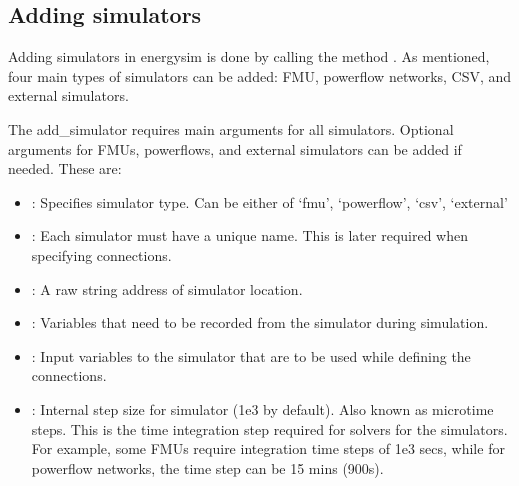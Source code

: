 \documentclass[letterpaper,10pt,english]{sphinxmanual}
\begin{document}
\begin{sphinxVerbatim}[commandchars=\\\{\}]
  
\end{sphinxVerbatim}


\subsection{Adding simulators}
\label{\detokenize{add_simulator:adding-simulators}}\label{\detokenize{add_simulator::doc}}
Adding simulators in energysim is done by calling the method .
As mentioned, four main types of simulators can be added: FMU, powerflow networks, CSV, and external simulators.

The add\_simulator requires  main arguments for all simulators. Optional arguments for FMUs, powerflows, and external simulators can be added if needed. These are:
\begin{itemize}
\item {} 
 : Specifies simulator type. Can be either of ‘fmu’, ‘powerflow’, ‘csv’, ‘external’

\item {} 
 : Each simulator must have a unique name. This is later required when specifying connections.

\item {} 
 : A raw string address of simulator location.

\item {} 
 : Variables that need to be recorded from the simulator during simulation.

\item {} 
 : Input variables to the simulator that are to be used while defining the connections.

\item {} 
 : Internal step size for simulator (1e\sphinxhyphen{}3 by default). Also known as micro\sphinxhyphen{}time steps. This is the time integration step required for solvers for the simulators. For example, some FMUs require integration time steps of 1e\sphinxhyphen{}3 secs, while for powerflow networks, the time step can be 15 mins (900s).

\end{itemize}
\end{document}
